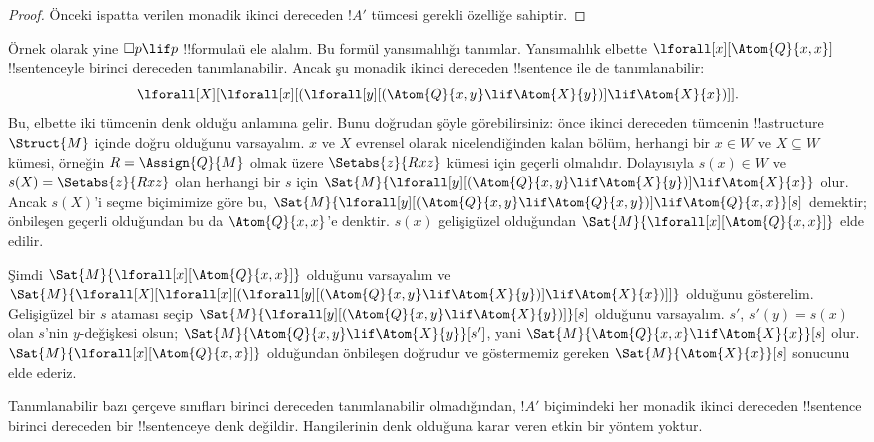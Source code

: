 \begin{proof}
  Önceki ispatta verilen monadik ikinci dereceden $!A'$ tümcesi gerekli
  özelliğe sahiptir.
\end{proof}

Örnek olarak yine $\Box p\lif p$ !!{formula}{}ü ele alalım. Bu formül
yansımalılığı tanımlar. Yansımalılık elbette $\lforall[x][\Atom{Q}{x,x}]$
!!{sentence}{}yle birinci dereceden tanımlanabilir. Ancak şu monadik ikinci
dereceden !!{sentence} ile de tanımlanabilir:
\[
\lforall[X][\lforall[x][(\lforall[y][(\Atom{Q}{x,y} \lif \Atom{X}{y})]
    \lif \Atom{X}{x})]].
\]
Bu, elbette iki tümcenin denk olduğu anlamına gelir. Bunu doğrudan şöyle
görebilirsiniz: önce ikinci dereceden tümcenin !!a{structure}
$\Struct{M}$ içinde doğru olduğunu varsayalım. $x$ ve $X$ evrensel olarak
nicelendiğinden kalan bölüm, herhangi bir $x\in W$ ve $X\subseteq W$ kümesi,
örneğin $R=\Assign{Q}{M}$ olmak üzere $\Setabs{z}{Rxz}$ kümesi için geçerli
olmalıdır. Dolayısıyla $s(x)\in W$ ve $s(X)=\Setabs{z}{Rxz}$ olan herhangi
bir $s$ için $\Sat{M}{\lforall[y][(\Atom{Q}{x,y}\lif
    \Atom{X}{y})]\lif\Atom{X}{x}}$ olur. Ancak $s(X)$'i seçme biçimimize
göre bu, $\Sat{M}{\lforall[y][(\Atom{Q}{x,y}\lif
    \Atom{Q}{x,y})]\lif\Atom{Q}{x,x}}[s]$ demektir; önbileşen geçerli
olduğundan bu da $\Atom{Q}{x,x}$'e denktir. $s(x)$ gelişigüzel olduğundan
$\Sat{M}{\lforall[x][\Atom{Q}{x,x}]}$ elde edilir.

Şimdi $\Sat{M}{\lforall[x][\Atom{Q}{x,x}]}$ olduğunu varsayalım ve
$\Sat{M}{\lforall[X][\lforall[x][(\lforall[y][(\Atom{Q}{x,y} \lif
        \Atom{X}{y})] \lif \Atom{X}{x})]]}$ olduğunu gösterelim.
Gelişigüzel bir $s$ ataması seçip
$\Sat{M}{\lforall[y][(\Atom{Q}{x,y}\lif\Atom{X}{y})]}[s]$ olduğunu
varsayalım. $s'$, $s'(y)=s(x)$ olan $s$'nin $y$-değişkesi olsun;
$\Sat{M}{\Atom{Q}{x,y}\lif\Atom{X}{y}}[s']$, yani
$\Sat{M}{\Atom{Q}{x,x}\lif\Atom{X}{x}}[s]$ olur.
$\Sat{M}{\lforall[x][\Atom{Q}{x,x}]}$ olduğundan önbileşen doğrudur ve
göstermemiz gereken $\Sat{M}{\Atom{X}{x}}[s]$ sonucunu elde ederiz.

Tanımlanabilir bazı çerçeve sınıfları birinci dereceden tanımlanabilir
olmadığından, $!A'$ biçimindeki her monadik ikinci dereceden !!{sentence}
birinci dereceden bir !!{sentence}{}ye denk değildir. Hangilerinin denk olduğuna
karar veren etkin bir yöntem yoktur.

